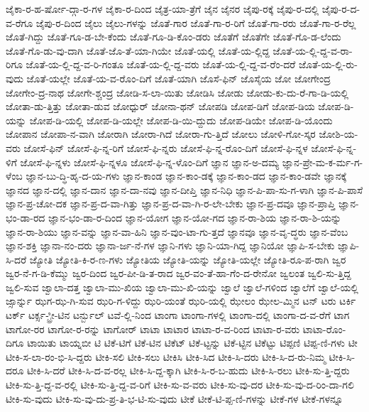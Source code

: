 {ಜೈಕಾ-ರ-ಹ-ರ್ಷೋ-ದ್ಗಾ-ರ-ಗಳ
ಜೈಕಾ-ರ-ದಿಂದ
ಜೈತ್ರ-ಯಾ-ತ್ರೆಗೆ
ಜೈನ
ಜೈನರ
ಜೈಪು-ರಕ್ಕೆ
ಜೈಪು-ರ-ದಲ್ಲಿ
ಜೈಪು-ರ-ದ-ವ-ರೆಗೂ
ಜೈಪು-ರ-ದಿಂದ
ಜೈಲು
ಜೈಲು-ಗಳನ್ನು
ಜೊತೆ-ಗಾರ
ಜೊತೆ-ಗಾ-ರ-ರಿಗೆ
ಜೊತೆ-ಗಾ-ರರು
ಜೊತೆ-ಗಾ-ರ-ರೆಲ್ಲ
ಜೊತೆ-ಗಿದ್ದು
ಜೊತೆ-ಗೂ-ಡ-ಬೇ-ಕೆಂದು
ಜೊತೆ-ಗೂ-ಡಿ-ಕೊಂ-ಡರು
ಜೊತೆಗೆ
ಜೊತೆಗೇ
ಜೊತೆ-ಗೊ-ಡ-ಲೆಂದು
ಜೊತೆ-ಗೊ-ಡು-ವು-ದಾಗಿ
ಜೊತೆ-ಜೊ-ತೆ-ಯಾ-ಗಿಯೇ
ಜೊತೆ-ಯಲ್ಲಿ
ಜೊತೆ-ಯ-ಲ್ಲಿದ್ದ
ಜೊತೆ-ಯ-ಲ್ಲಿ-ದ್ದ-ವ-ರಾ-ರಿಗೂ
ಜೊತೆ-ಯ-ಲ್ಲಿ-ದ್ದ-ವ-ರಿ-ಗಂತೂ
ಜೊತೆ-ಯ-ಲ್ಲಿ-ದ್ದ-ವರು
ಜೊತೆ-ಯ-ಲ್ಲಿ-ದ್ದ-ವ-ರೆಂ-ದರೆ
ಜೊತೆ-ಯ-ಲ್ಲಿ-ರು-ವುದು
ಜೊತೆ-ಯಲ್ಲೇ
ಜೊತೆ-ಯ-ವ-ರೊಂ-ದಿಗೆ
ಜೊತೆ-ಯಾಗಿ
ಜೊಸೆ-ಫಿನ್
ಜೊಸೈಯ
ಜೋ
ಜೋಗೇಂದ್ರ
ಜೋಗೇಂ-ದ್ರ-ನಾಥ
ಜೋಗೇ-ಶ್ಚಂದ್ರ
ಜೋಡಿ-ಸ-ಲಾ-ಯಿತು
ಜೋಡಿಸಿ
ಜೋಡು
ಜೋಡು-ಕು-ದು-ರೆ-ಗಾ-ಡಿ-ಯಲ್ಲಿ
ಜೋತಾ-ಡು-ತ್ತಿತ್ತು
ಜೋತಾ-ಡುವ
ಜೋಧ್ಪುರ್
ಜೋನಾ-ಥನ್
ಜೋಪಡಿ
ಜೋಪ-ಡಿಗೆ
ಜೋಪ-ಡಿಯ
ಜೋಪ-ಡಿ-ಯನ್ನು
ಜೋಪ-ಡಿ-ಯಲ್ಲಿ
ಜೋಪ-ಡಿ-ಯಲ್ಲೇ
ಜೋಪ-ಡಿ-ಯಿ-ದ್ದುದು
ಜೋಪ-ಡಿಯೇ
ಜೋಪ-ಡಿ-ಯೊಂದು
ಜೋಪಾನ
ಜೋಪಾ-ನ-ವಾಗಿ
ಜೋರಾಗಿ
ಜೋರಾ-ಗಿದೆ
ಜೋರಾ-ಗು-ತ್ತಿದೆ
ಜೋಲು
ಜೋಳಿ-ಗೋ-ಸ್ಕರ
ಜೋಶಿ-ಯ-ವರು
ಜೋಸೆ-ಫಿನ್
ಜೋಸೆ-ಫಿ-ನ್ನ-ರಿಗೆ
ಜೋಸೆ-ಫಿ-ನ್ನರು
ಜೋಸೆ-ಫಿ-ನ್ನ-ರೊಂ-ದಿಗೆ
ಜೋಸೆ-ಫಿ-ನ್ನಳ
ಜೋಸೆ-ಫಿ-ನ್ನ-ಳಿಗೆ
ಜೋಸೆ-ಫಿ-ನ್ನಳು
ಜೋಸೆ-ಫಿ-ನ್ನಳೂ
ಜೋಸೆ-ಫಿ-ನ್ನ-ಳೊಂ-ದಿಗೆ
ಜ್ಞಾನ
ಜ್ಞಾನ-ಅ-ದಮ್ಯ
ಜ್ಞಾನ-ಪ್ರೇ-ಮ-ಕ-ರ್ಮ-ಗ-ಳೆಂಬ
ಜ್ಞಾನ-ಬು-ದ್ಧಿ-ಹೃ-ದ-ಯ-ಗಳು
ಜ್ಞಾನ-ಕಾಂಡ
ಜ್ಞಾನ-ಕಾಂ-ಡಕ್ಕೆ
ಜ್ಞಾನ-ಕಾಂ-ಡದ
ಜ್ಞಾನ-ಕಾಂ-ಡವೇ
ಜ್ಞಾನಕ್ಕೆ
ಜ್ಞಾನದ
ಜ್ಞಾನ-ದಲ್ಲಿ
ಜ್ಞಾನ-ದಾನ
ಜ್ಞಾನ-ದಾ-ನವು
ಜ್ಞಾನ-ದೀಪ್ತಿ
ಜ್ಞಾನ-ನಿಧಿ
ಜ್ಞಾನ-ಪಿ-ಪಾ-ಸು-ಗ-ಳಾಗಿ
ಜ್ಞಾನ-ಪಿ-ಪಾಸೆ
ಜ್ಞಾನ-ಪ್ರ-ಚೋ-ದಕ
ಜ್ಞಾನ-ಪ್ರ-ದ-ವಾ-ಗಿತ್ತು
ಜ್ಞಾನ-ಪ್ರ-ದ-ವಾ-ಗಿ-ರ-ಲೇ-ಬೇಕು
ಜ್ಞಾನ-ಪ್ರ-ದವೂ
ಜ್ಞಾನ-ಪ್ರಾಪ್ತಿ
ಜ್ಞಾನ-ಭಂ-ಡಾ-ರದ
ಜ್ಞಾನ-ಭಂ-ಡಾ-ರ-ದಿಂದ
ಜ್ಞಾನ-ಯೋಗ
ಜ್ಞಾನ-ಯೋ-ಗದ
ಜ್ಞಾನ-ರಾ-ಶಿಯ
ಜ್ಞಾನ-ರಾ-ಶಿ-ಯನ್ನು
ಜ್ಞಾನ-ರಾ-ಶಿಯು
ಜ್ಞಾನ-ವನ್ನು
ಜ್ಞಾನ-ವಾ-ಹಿನಿ
ಜ್ಞಾನ-ವುಂ-ಟಾ-ಗು-ತ್ತದೆ
ಜ್ಞಾನವೂ
ಜ್ಞಾನ-ವೃ-ದ್ಧರು
ಜ್ಞಾನ-ವೆಂಬ
ಜ್ಞಾನ-ಶಕ್ತಿ
ಜ್ಞಾನಾ-ನಂ-ದರು
ಜ್ಞಾನಾ-ರ್ಜ-ನೆ-ಗಳ
ಜ್ಞಾನಿ-ಗಳು
ಜ್ಞಾನಿ-ಯಾ-ಗಿದ್ದ
ಜ್ಞಾನಿಯೋ
ಜ್ಞಾಪಿ-ಸ-ಬೇಕು
ಜ್ಞಾಪಿ-ಸಿ-ದರೆ
ಜ್ಯೋತಿ
ಜ್ಯೋತಿ-ಕಿ-ರ-ಣ-ಗಳು
ಜ್ಯೋತಿಯ
ಜ್ಯೋತಿ-ಯನ್ನು
ಜ್ಯೋತಿ-ಯಲ್ಲೇ
ಜ್ಯೋತಿ-ರೂ-ಪ-ರಾಗಿ
ಜ್ವರ
ಜ್ವರ-ನೆ-ಗ-ಡಿ-ಕೆಮ್ಮು
ಜ್ವರ-ದಿಂದ
ಜ್ವರ-ಪೀ-ಡಿ-ತ-ರಾದ
ಜ್ವರ-ವಂ-ತೆ-ಹಾ-ಗೆಂ-ದ-ರೇನೋ
ಜ್ವಲಂತ
ಜ್ವಲಿ-ಸು-ತ್ತಿದ್ದ
ಜ್ವಲಿ-ಸುವ
ಜ್ವಾಲಾ-ದತ್ತ
ಜ್ವಾಲಾ-ಮು-ಖಿಯ
ಜ್ವಾಲಾ-ಮು-ಖಿ-ಯನ್ನು
ಜ್ವಾಲೆ
ಜ್ವಾಲೆ-ಗಳಿಂದ
ಜ್ವಾಲೆಗೆ
ಜ್ವಾಲೆ-ಯಲ್ಲಿ
ಜ್ಸಾರ್ನ್ನು
ಝಗ-ಝ-ಗಿ-ಸುವ
ಝರಿ-ಗ-ಳಿದ್ದು
ಝರಿ-ಯಂತೆ
ಝರಿ-ಯಲ್ಲಿ
ಝೇಲಂ
ಝೇಲ-ಮ್ಮಿನ
ಟನ್
ಟರು
ಟರ್ಕಿ
ಟರ್ಕ್
ಟರ್ಕ್ಸ-್ಟ್ರೀ-ಟಿನ
ಟರ್ನ್ಬುಲ್
ಟವೆ-ಲ್ಲಿ-ನಿಂದ
ಟಾಂಗಾ
ಟಾಂಗಾ-ಗಳಲ್ಲಿ
ಟಾಂಗಾ-ದಲ್ಲಿ
ಟಾಂಗಾ-ದ-ವ-ರೆಗೆ
ಟಾಗ
ಟಾಗೋ-ರರ
ಟಾಗೋ-ರ-ರನ್ನು
ಟಾಗೋರ್
ಟಾಟಾ
ಟಾಟಾರ
ಟಾಟಾ-ರ-ವ-ರಿಂದ
ಟಾಟಾ-ರ-ವರು
ಟಾಟಾ-ರೊಂ-ದಿಗೂ
ಟಾಯಿತು
ಟಾಯ್ನಬೀ
ಟಿ
ಟಿಕೆ-ಟಿಗೆ
ಟಿಕೆ-ಟಿನ
ಟಿಕೆಟ್
ಟಿಕೆ-ಟ್ಟನ್ನು
ಟಿಕೆ-ಟ್ಟಿನ
ಟಿಕೆಟ್ಟು
ಟಿಪ್ಪಣಿ
ಟಿಪ್ಪ-ಣಿ-ಗಳು
ಟೀ
ಟೀಕಿ-ಸ-ಲಾ-ರಂ-ಭಿ-ಸಿ-ದ್ದರು
ಟೀಕಿ-ಸಲಿ
ಟೀಕಿ-ಸಲು
ಟೀಕಿಸಿ
ಟೀಕಿ-ಸಿದ
ಟೀಕಿ-ಸಿ-ದರು
ಟೀಕಿ-ಸಿ-ದ-ರು-ನಿಮ್ಮ
ಟೀಕಿ-ಸಿ-ದರೂ
ಟೀಕಿ-ಸಿ-ದರೆ
ಟೀಕಿ-ಸಿ-ದ-ವ-ರಲ್ಲ
ಟೀಕಿ-ಸಿ-ದ್ದ-ಕ್ಕಾಗಿ
ಟೀಕಿ-ಸಿ-ರ-ಬ-ಹುದು
ಟೀಕಿ-ಸಿ-ರಲು
ಟೀಕಿ-ಸು-ತ್ತಿ-ದ್ದರು
ಟೀಕಿ-ಸು-ತ್ತಿ-ದ್ದ-ವ-ರಲ್ಲಿ
ಟೀಕಿ-ಸು-ತ್ತಿ-ದ್ದ-ವ-ರಿಗೆ
ಟೀಕಿ-ಸು-ವ-ವರು
ಟೀಕಿ-ಸು-ವು-ದರ
ಟೀಕಿ-ಸು-ವು-ದ-ರಿಂ-ದಾ-ಗಲಿ
ಟೀಕಿ-ಸು-ವುದು
ಟೀಕಿ-ಸು-ವು-ದು-ಪ್ರ-ತಿ-ಭ-ಟಿ-ಸು-ವುದು
ಟೀಕೆ
ಟೀಕೆ-ಟಿ-ಪ್ಪ-ಣಿ-ಗಳನ್ನು
ಟೀಕೆ-ಗಳ
ಟೀಕೆ-ಗಳನ್ನೂ
}
